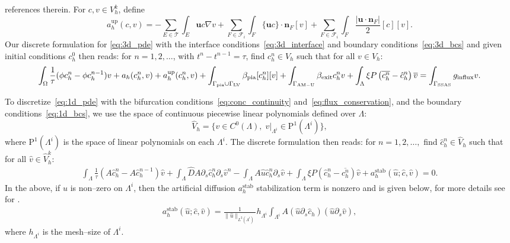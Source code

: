 references therein. For $c, v \in V_h^k$, define
\begin{equation}
  a_h^{\mathrm{up}}(c, v)
  = - \sum_{E \in \mathcal{T}} \int_E \bm{u} c \nabla v
  + \sum_{F \in \mathcal{F}_i } \int_F \{ \bm u  c\} \cdot \bm{n}_F [v] +
  \sum_{F \in \mathcal{F}_i} \int_F \frac{|\bm u \cdot \bm n_F|}{2} [c] [v] .
\end{equation}
Our discrete formulation for \eqref{eq:3d_pde} with the interface conditions~\eqref{eq:3d_interface} and boundary conditions~\eqref{eq:3d_bcs} and given initial conditions $c_h^0$ then reads: for $n = 1, 2, \dots$, with $t^n - t^{n-1} = \tau$, find $c_h^n \in V_h$ such that for all $v \in V_h$:
\begin{equation} \label{eq:3d_dg_disc}
  \int_{\Omega} \frac{1}{\tau} (\phi c_h^n - \phi c_h^{n-1}) v
  + a_h(c_h^n, v) + a_h^{\mathrm{up}}(c_h^n,v)
  + \int_{\Gamma_{\rm pia} \cup \Gamma_{\rm LV}} \beta_{\rm pia}[c_h^n][v] 
  + \int_{\Gamma_{\rm AM-U}} \beta_{\rm exit} c_h^n v 
  + \int_{\Lambda} \xi  P \left (\overline{c_h^n} - \hat c_h^n \right) \overline{v} 
  = 
  \int_{\Gamma_{\rm SSAS}} g_{\rm influx} v
  .
\end{equation}

To discretize~\eqref{eq:1d_pde} with the bifurcation
conditions~\eqref{eq:conc_continuity}
and~\eqref{eq:flux_conservation}, and the boundary
conditions~\eqref{eq:1d_bcs}, we use the space of continuous piecewise
linear polynomials defined over $\Lambda$:
\begin{equation}
  \hat V_h
  = \{ v \in C^0(\Lambda), \; v \vert_{\Lambda^i} \in \mathrm{P}^1(\Lambda^i) \}, 
\end{equation}
where $\mathrm{P}^1(\Lambda^i)$ is the space of linear polynomials on each $\Lambda^i$. The discrete formulation then reads: for $n = 1,2,\ldots, $ find $\hat c_h^n \in \hat V_h$ such that for all $\hat v \in \hat V_h^k$: 
\begin{align}\label{eq:1d_dg_disc}
\int_{\Lambda}  \frac{1}{\tau}(A  \hat c_h^n - A \hat c_h^{n-1}) \hat v  + \int_{\Lambda} \hat D A \partial_s \hat c_h^n  \partial_s \hat v^n - \int_{\Lambda} A \hat u \hat c_h^n \partial_s \hat v   +  \int_{\Lambda} \xi P (\hat c_h^n - \overline{c_h^n}) \hat v +a_h^{\mathrm{stab}}(\hat u; \hat c, \hat v) = 0.  
\end{align}
 In the above, if $\hat u$ is non--zero on $\Lambda^i$, then the artificial diffusion $a_h^{\mathrm{stab}}$ stabilization term is nonzero  and is given below, for more details see for  \cite[Section 12.6]{quarteroni2009numerical}. 
 \begin{align}
    a_h^{\mathrm{stab}}(\hat u; \hat c, \hat v) =  \frac{1}{\|\hat u\|_{L^2(\Lambda^i)}} 
 h_{\Lambda^i} \int_{\Lambda^i} A (\hat u \partial_s \hat c_h  ) (\hat u \partial_s \hat v),  
 \end{align}
 where $h_{\Lambda^i}$ is the mesh--size of $\Lambda^i$.

